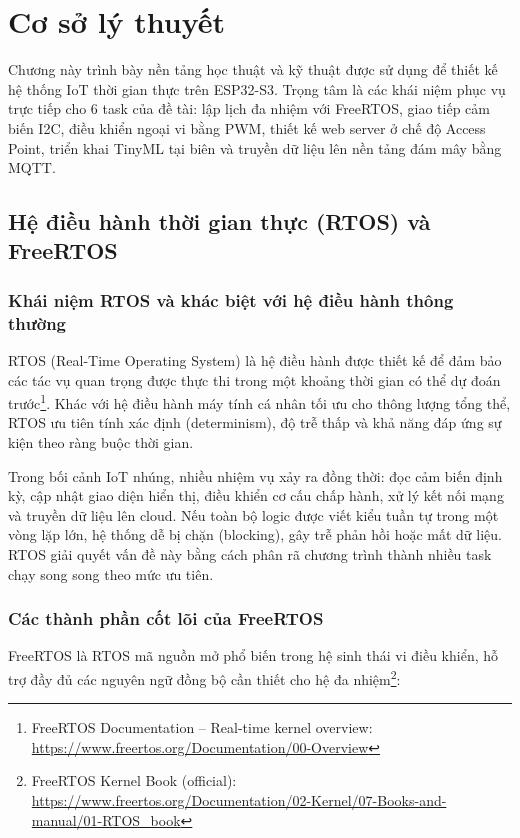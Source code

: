 ﻿\newpage
\section{Cơ sở lý thuyết}

Chương này trình bày nền tảng học thuật và kỹ thuật được sử dụng để thiết kế hệ thống IoT thời gian thực trên ESP32-S3. Trọng tâm là các khái niệm phục vụ trực tiếp cho 6 task của đề tài: lập lịch đa nhiệm với FreeRTOS, giao tiếp cảm biến I2C, điều khiển ngoại vi bằng PWM, thiết kế web server ở chế độ Access Point, triển khai TinyML tại biên và truyền dữ liệu lên nền tảng đám mây bằng MQTT.

\subsection{Hệ điều hành thời gian thực (RTOS) và FreeRTOS}

\subsubsection*{Khái niệm RTOS và khác biệt với hệ điều hành thông thường}

RTOS (Real-Time Operating System) là hệ điều hành được thiết kế để đảm bảo các tác vụ quan trọng được thực thi trong một khoảng thời gian có thể dự đoán trước\footnote{FreeRTOS Documentation -- Real-time kernel overview: \url{https://www.freertos.org/Documentation/00-Overview}}. Khác với hệ điều hành máy tính cá nhân tối ưu cho thông lượng tổng thể, RTOS ưu tiên tính xác định (determinism), độ trễ thấp và khả năng đáp ứng sự kiện theo ràng buộc thời gian.

Trong bối cảnh IoT nhúng, nhiều nhiệm vụ xảy ra đồng thời: đọc cảm biến định kỳ, cập nhật giao diện hiển thị, điều khiển cơ cấu chấp hành, xử lý kết nối mạng và truyền dữ liệu lên cloud. Nếu toàn bộ logic được viết kiểu tuần tự trong một vòng lặp lớn, hệ thống dễ bị chặn (blocking), gây trễ phản hồi hoặc mất dữ liệu. RTOS giải quyết vấn đề này bằng cách phân rã chương trình thành nhiều task chạy song song theo mức ưu tiên.

\subsubsection*{Các thành phần cốt lõi của FreeRTOS}

FreeRTOS là RTOS mã nguồn mở phổ biến trong hệ sinh thái vi điều khiển, hỗ trợ đầy đủ các nguyên ngữ đồng bộ cần thiết cho hệ đa nhiệm\footnote{FreeRTOS Kernel Book (official): \url{https://www.freertos.org/Documentation/02-Kernel/07-Books-and-manual/01-RTOS_book}}:

